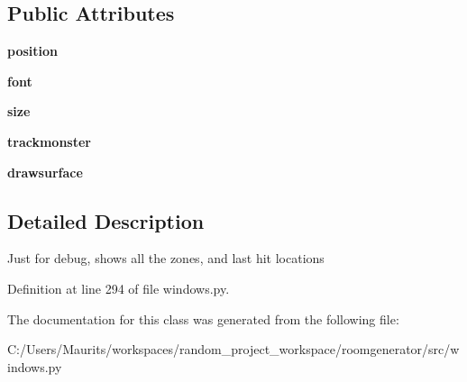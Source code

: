 \subsection*{Public Attributes}
\begin{DoxyCompactItemize}
\item 
\hypertarget{classwindows_1_1_combat_debug_window_adfb257dd47b31d77c02b797b0c4ec9ed}{}{\bfseries position}\label{classwindows_1_1_combat_debug_window_adfb257dd47b31d77c02b797b0c4ec9ed}

\item 
\hypertarget{classwindows_1_1_combat_debug_window_aaf3dc72b52b5000154c04f7eb029f2f8}{}{\bfseries font}\label{classwindows_1_1_combat_debug_window_aaf3dc72b52b5000154c04f7eb029f2f8}

\item 
\hypertarget{classwindows_1_1_combat_debug_window_ab2352163bb3397a0dd3a55a0e37c563c}{}{\bfseries size}\label{classwindows_1_1_combat_debug_window_ab2352163bb3397a0dd3a55a0e37c563c}

\item 
\hypertarget{classwindows_1_1_combat_debug_window_a7fc02692f53288315ad9605dd82cd1a1}{}{\bfseries trackmonster}\label{classwindows_1_1_combat_debug_window_a7fc02692f53288315ad9605dd82cd1a1}

\item 
\hypertarget{classwindows_1_1_combat_debug_window_ac18a32bd132cf0f73e0584493c67dd52}{}{\bfseries drawsurface}\label{classwindows_1_1_combat_debug_window_ac18a32bd132cf0f73e0584493c67dd52}

\end{DoxyCompactItemize}


\subsection{Detailed Description}
\begin{DoxyVerb}Just for debug, shows all the zones, and last hit locations\end{DoxyVerb}
 

Definition at line 294 of file windows.\+py.



The documentation for this class was generated from the following file\+:\begin{DoxyCompactItemize}
\item 
C\+:/\+Users/\+Maurits/workspaces/random\+\_\+project\+\_\+workspace/roomgenerator/src/windows.\+py\end{DoxyCompactItemize}

